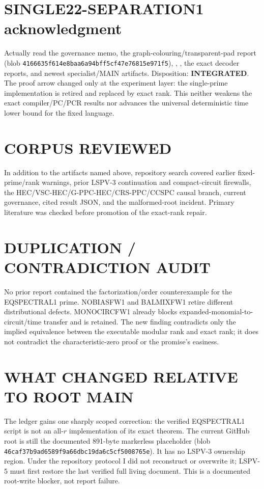 \documentclass[11pt]{article}
\begin{document}
\section{SINGLE22-SEPARATION1 acknowledgment}
Actually read the governance memo, the graph-colouring/transparent-pad report
(blob \texttt{4166635f614e8baa6a94bff5cf47e76815e971f5}),
, , the exact decoder reports,
and newest specialist/MAIN artifacts.  Disposition: \textbf{INTEGRATED}.
The proof arrow changed only at the experiment layer: the single-prime
implementation is retired and replaced by exact rank.  This neither weakens
the exact compiler/PC/PCR results nor advances the universal deterministic
time lower bound for the fixed language.

\section{CORPUS REVIEWED}
In addition to the artifacts named above, repository search covered earlier
fixed-prime/rank warnings, prior LSPV-3 continuation and compact-circuit
firewalls, the HEC/VSC-HEC/G-PPC-HEC/CRS-PPC/CCSPC causal branch, current
governance, cited result JSON, and the malformed-root incident.  Primary
literature was checked before promotion of the exact-rank repair.

\section{DUPLICATION / CONTRADICTION AUDIT}
No prior report contained the factorization/order counterexample for the
EQSPECTRAL1 prime.  NOBIASFW1 and BALMIXFW1 retire different distributional
defects.  MONOCIRCFW1 already blocks expanded-monomial-to-circuit/time
transfer and is retained.  The new finding contradicts only the implied
equivalence between the executable modular rank and exact rank; it does not
contradict the characteristic-zero proof or the promise's easiness.

\section{WHAT CHANGED RELATIVE TO ROOT MAIN}
The ledger gains one sharply scoped correction: the verified EQSPECTRAL1
script is not an all-$r$ implementation of its exact theorem.  The current
GitHub root  is still the documented 891-byte markerless
placeholder (blob \texttt{46caf37b9ad6589f9a66dbc19da6c5cf5008765e}).
It has no LSPV-3 ownership region.  Under the repository protocol I did not
reconstruct or overwrite it; LSPV-5 must first restore the last verified full
living document.  This is a documented root-write blocker, not report failure.
\end{document}
